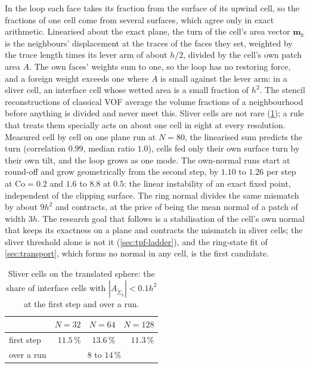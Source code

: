 \documentclass[preprint,12pt]{elsarticle}
\begin{document}
In the loop each face takes its fraction from the surface of its upwind cell, so the fractions of one cell come from several surfaces, which agree only in exact arithmetic. Linearised about the exact plane, the turn of the cell's area vector $\mathbf{m}_k$ is the neighbours' displacement at the traces of the faces they set, weighted by the trace length times its lever arm of about $h/2$, divided by the cell's own patch area $A$. The own faces' weights sum to one, so the loop has no restoring force, and a foreign weight exceeds one where $A$ is small against the lever arm: in a sliver cell, an interface cell whose wetted area is a small fraction of $h^2$. The stencil reconstructions of classical VOF average the volume fractions of a neighbourhood before anything is divided and never meet this. Sliver cells are not rare (\cref{tab:tpf-sliver}); a rule that treats them specially acts on about one cell in eight at every resolution. Measured cell by cell on one plane run at $N = 80$, the linearised sum predicts the turn (correlation $0.99$, median ratio $1.0$), cells fed only their own surface turn by their own tilt, and the loop grows as one mode. The own-normal runs start at round-off and grow geometrically from the second step, by $1.10$ to $1.26$ per step at $\mathrm{Co} = 0.2$ and $1.6$ to $8.8$ at $0.5$: the linear instability of an exact fixed point, independent of the clipping surface. The ring normal divides the same mismatch by about $9h^2$ and contracts, at the price of being the mean normal of a patch of width $3h$. The research goal that follows is a stabilisation of the cell's own normal that keeps its exactness on a plane and contracts the mismatch in sliver cells; the sliver threshold alone is not it (\cref{sec:tpf-ladder}), and the ring-state fit of \cref{sec:transport}, which forms no normal in any cell, is the first candidate.

\begin{table}[htbp]
\centering
\caption{Sliver cells on the translated sphere: the share of interface cells with $|A_{\tilde\Sigma_k}| < 0.1 h^2$ at the first step and over a run.}
\label{tab:tpf-sliver}
\footnotesize
\begin{tabular}{lrrr}
\toprule
 & $N = 32$ & $N = 64$ & $N = 128$ \\
\midrule
first step & $11.5\,\%$ & $13.6\,\%$ & $11.3\,\%$ \\
over a run & \multicolumn{3}{c}{$8$ to $14\,\%$} \\
\bottomrule
\end{tabular}
\end{table}
\end{document}
